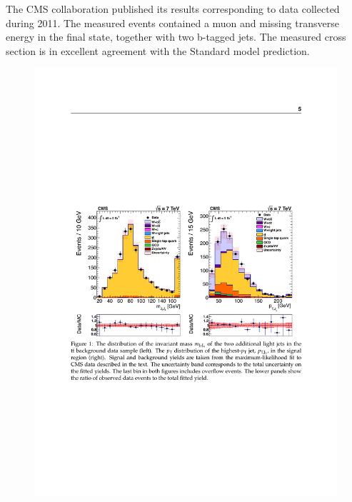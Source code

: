 The CMS collaboration published its results corresponding to data collected during 2011. The measured events contained a muon and missing transverse energy in the final state, together with two b-tagged jets. The measured cross section is in excellent agreement with the Standard model prediction.\citep{Chatrchyan:2013uza}

\begin{figure}[htbp]
	\centering
		\includegraphics{Figures/cms_tot.pdf}
	\caption[CMS Wbb total cross section measurement]{\cite{Chatrchyan:2013uza} }
	\label{fig:cms_total}
\end{figure}
